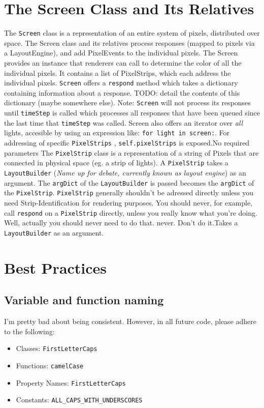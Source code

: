 \documentclass{article}
\begin{document}
\begin{itemize}
\section{The Screen Class and Its Relatives}
{The \texttt{Screen} class is a representation of an entire system of pixels,
    distributed over space.  The Screen class and its relatives process
        responses (mapped to pixels via a LayoutEngine), and add PixelEvents
        to the individual pixels.  The Screen provides an instance that
        renderers can call to determine the color of all the individual pixels. It contains a list of PixelStrips, which each
        address the individual pixels.  \texttt{Screen} offers a
        \texttt{respond} method which takes a dictionary containing information
        about a response.  TODO: detail the contents of this dictionary (maybe
                somewhere else).  Note: \texttt{Screen} will not process its
        responses until \texttt{timeStep} is called which processes all responses that
        have been queued since the last time that \texttt{timeStep} was
        called.  Screen also offers an iterator over \textit{all} lights,
    accesible by using an expression like: \texttt{for light in screen:}.  For
        addressing of specific \texttt{PixelStrips} , \texttt{self.pixelStrips}
    is exposed.}{No required parameters}
{The \texttt{PixelStrip} class is a representation of a string of Pixels that are
    connected in physical space (eg. a strip of lights).  A \texttt{PixelStrip} takes a
        \texttt{LayoutBuilder} (\textit{Name up for debate, currently known as layout
            engine}) as an argument.  The \texttt{argDict} of the
        \texttt{LayoutBuilder} is
        passed becomes the \texttt{argDict} of the \texttt{PixelStrip}.
        \texttt{PixelStrip} generally shouldn't be
        adressed directly unless you need Strip-Identification for rendering
        purposes.  You should never, for example, call \texttt{respond} on a
        \texttt{PixelStrip}
        directly, unless you really know what you're doing.  Well, actually you
            should never need to do that.
        never.  Don't do it.}{Takes a \texttt{LayoutBuilder} as an argument.}
    \section{Best Practices}
        \subsection{Variable and function naming}
            I'm pretty bad about being consistent.  However, in all future
            code, please adhere to the following:
            \begin{itemize}
                \item Classes: \texttt{FirstLetterCaps}
                \item Functions: \texttt{camelCase}
                \item Property Names: \texttt{FirstLetterCaps}
                \item Constants: \texttt{ALL\_CAPS\_WITH\_UNDERSCORES}
            \end{itemize}

\end{itemize}
\end{document}
